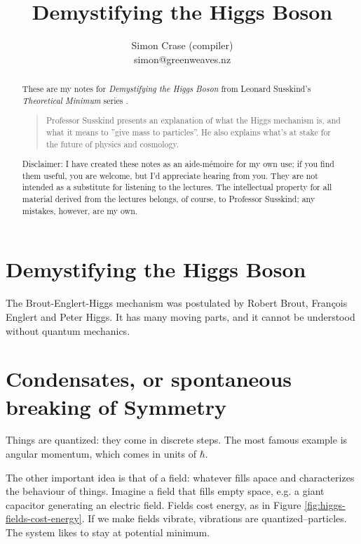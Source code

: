 \documentclass[]{article}
\title{Demystifying the Higgs Boson}
\author{Simon Crase (compiler)\\simon@greenweaves.nz}
\begin{document}
\maketitle

\begin{abstract}
These are my notes for \emph{Demystifying the Higgs Boson}  from Leonard Susskind's \emph{Theoretical Minimum} series \cite[Demystifying the Higgs Boson]{susskind2007theoretical}.

\begin{quotation}
	Professor Susskind presents an explanation of what the Higgs mechanism is, and what it means to ''give mass to particles''. He also explains what's at stake for the future of physics and cosmology.
\end{quotation}

Disclaimer: I have created these notes as an aide-m\'emoire for my own use; if you find them useful, you are welcome, but I'd appreciate hearing from you. They are not intended as a substitute for listening to the lectures. The intellectual property for all material derived from the lectures belongs, of course, to Professor Susskind; any mistakes, however, are my own.


\end{abstract}

\tableofcontents
\listoffigures
\listoftables
\listoftheorems

\section{Demystifying the Higgs Boson}

The  Brout-Englert-Higgs mechanism was postulated by Robert Brout, Fran\c{c}ois Englert and Peter Higgs. It has many moving parts, and it cannot be understood without quantum mechanics.

\section{Condensates, or spontaneous breaking of Symmetry}

Things are quantized: they come in discrete steps. The most famous example is angular momentum, which comes in units of $\hbar$.

The other important idea is that of a field: whatever fills apace and characterizes the behaviour of things. Imagine a field that fills empty space, e.g. a giant capacitor generating an electric field. Fields cost energy, as in Figure \ref{fig:higgs-fields-cost-energy}. If we make fields vibrate, vibrations are quantized--particles. The system likes to stay at potential minimum.
\end{document}
